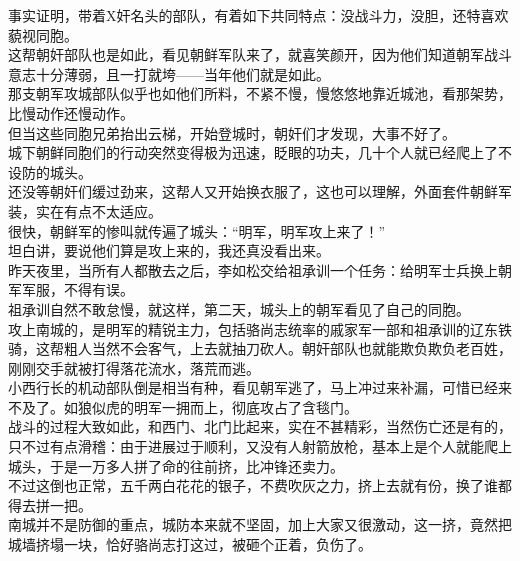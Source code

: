 \begin{multicols}{\theparacolNo}
事实证明，带着X奸名头的部队，有着如下共同特点：没战斗力，没胆，还特喜欢藐视同胞。\\

这帮朝奸部队也是如此，看见朝鲜军队来了，就喜笑颜开，因为他们知道朝军战斗意志十分薄弱，且一打就垮——当年他们就是如此。\\

那支朝军攻城部队似乎也如他们所料，不紧不慢，慢悠悠地靠近城池，看那架势，比慢动作还慢动作。\\

但当这些同胞兄弟抬出云梯，开始登城时，朝奸们才发现，大事不好了。\\

城下朝鲜同胞们的行动突然变得极为迅速，眨眼的功夫，几十个人就已经爬上了不设防的城头。\\

还没等朝奸们缓过劲来，这帮人又开始换衣服了，这也可以理解，外面套件朝鲜军装，实在有点不太适应。\\

很快，朝鲜军的惨叫就传遍了城头：“明军，明军攻上来了！”\\

坦白讲，要说他们算是攻上来的，我还真没看出来。\\

昨天夜里，当所有人都散去之后，李如松交给祖承训一个任务：给明军士兵换上朝军军服，不得有误。\\

祖承训自然不敢怠慢，就这样，第二天，城头上的朝军看见了自己的同胞。\\

攻上南城的，是明军的精锐主力，包括骆尚志统率的戚家军一部和祖承训的辽东铁骑，这帮粗人当然不会客气，上去就抽刀砍人。朝奸部队也就能欺负欺负老百姓，刚刚交手就被打得落花流水，落荒而逃。\\

小西行长的机动部队倒是相当有种，看见朝军逃了，马上冲过来补漏，可惜已经来不及了。如狼似虎的明军一拥而上，彻底攻占了含毯门。\\

战斗的过程大致如此，和西门、北门比起来，实在不甚精彩，当然伤亡还是有的，只不过有点滑稽：由于进展过于顺利，又没有人射箭放枪，基本上是个人就能爬上城头，于是一万多人拼了命的往前挤，比冲锋还卖力。\\

不过这倒也正常，五千两白花花的银子，不费吹灰之力，挤上去就有份，换了谁都得去拼一把。\\

南城并不是防御的重点，城防本来就不坚固，加上大家又很激动，这一挤，竟然把城墙挤塌一块，恰好骆尚志打这过，被砸个正着，负伤了。\\


\end{multicols}
